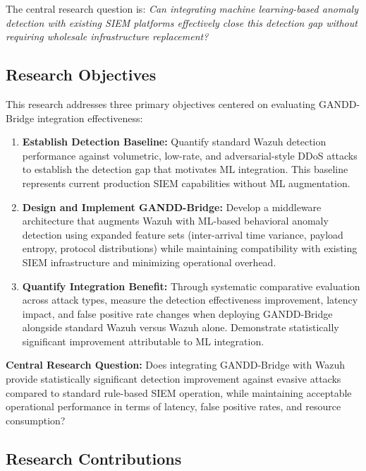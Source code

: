 The central research question is: \textit{Can integrating machine learning-based anomaly detection with existing SIEM platforms effectively close this detection gap without requiring wholesale infrastructure replacement?}

\subsection{Research Objectives}

This research addresses three primary objectives centered on evaluating GANDD-Bridge integration effectiveness:

\begin{enumerate}
    \item \textbf{Establish Detection Baseline:} Quantify standard Wazuh detection performance against volumetric, low-rate, and adversarial-style DDoS attacks to establish the detection gap that motivates ML integration. This baseline represents current production SIEM capabilities without ML augmentation.
    
    \item \textbf{Design and Implement GANDD-Bridge:} Develop a middleware architecture that augments Wazuh with ML-based behavioral anomaly detection using expanded feature sets (inter-arrival time variance, payload entropy, protocol distributions) while maintaining compatibility with existing SIEM infrastructure and minimizing operational overhead.
    
    \item \textbf{Quantify Integration Benefit:} Through systematic comparative evaluation across attack types, measure the detection effectiveness improvement, latency impact, and false positive rate changes when deploying GANDD-Bridge alongside standard Wazuh versus Wazuh alone. Demonstrate statistically significant improvement attributable to ML integration.
\end{enumerate}

\textbf{Central Research Question:} Does integrating GANDD-Bridge with Wazuh provide statistically significant detection improvement against evasive attacks compared to standard rule-based SIEM operation, while maintaining acceptable operational performance in terms of latency, false positive rates, and resource consumption?

\subsection{Research Contributions}

